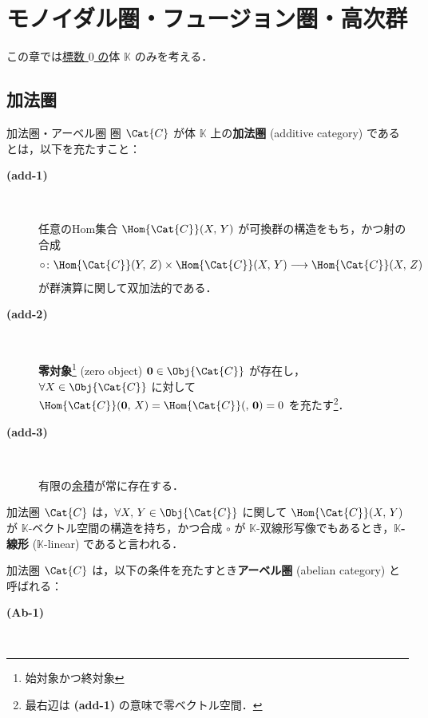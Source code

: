 \documentclass[TQFT_main]{subfiles}
\begin{document}
    \chapter{モノイダル圏・フュージョン圏・高次群}

    この章では\underline{標数 $0$ の}体 $\mathbb{K}$ のみを考える．

    \section{加法圏}

    \begin{mydef}[label=def:additive-cat,breakable]{加法圏・アーベル圏}
        圏 $\Cat{C}$ が体 $\mathbb{K}$ 上の\textbf{加法圏} (additive category) であるとは，以下を充たすこと：
        \begin{description}
            \item[\textbf{(add-1)}]　
            
            任意のHom集合 $\Hom{\Cat{C}}(X,\, Y)$ が可換群の構造をもち，かつ射の合成
            \begin{align}
                \circ \colon \Hom{\Cat{C}}(Y,\, Z) \times \Hom{\Cat{C}}(X,\, Y) \lto \Hom{\Cat{C}}(X,\, Z)
            \end{align}
            が群演算に関して双加法的である．

            \item[\textbf{(add-2)}]　
            
            \textbf{零対象}\footnote{始対象かつ終対象} (zero object) $\bm{0} \in \Obj{\Cat{C}}$ が存在し，$\forall X \in \Obj{\Cat{C}}$ に対して $\Hom{\Cat{C}}(\bm{0},\, X) = \Hom{\Cat{C}}(,\, \bm{0}) = 0$ を充たす\footnote{最右辺は \textsf{\textbf{(add-1)}} の意味で零ベクトル空間．}．

            \item[\textbf{(add-3)}]　
            
            有限の\hyperref[def:product-coproduct]{余積}が常に存在する．
        \end{description}
        加法圏 $\Cat{C}$ は，$\forall X,\, Y \in \Obj{\Cat{C}}$ に関して $\Hom{\Cat{C}}(X,\, Y)$ が $\mathbb{K}$-ベクトル空間の構造を持ち，かつ合成 $\circ$ が $\mathbb{K}$-双線形写像でもあるとき，\textbf{$\mathbb{K}$-線形} ($\mathbb{K}$-linear) であると言われる．

        \tcblower

        加法圏 $\Cat{C}$ は，以下の条件を充たすとき\textbf{アーベル圏} (abelian category) と呼ばれる：
        \begin{description}
            \item[\textbf{(Ab-1)}]　
            

\end{description}
\end{mydef}
\end{document}
